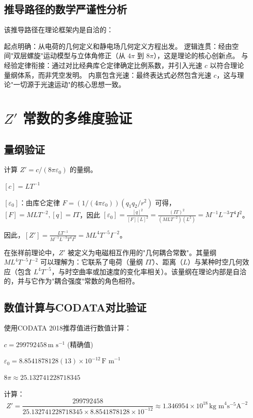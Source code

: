 \documentclass[a4paper,12pt]{article}
\theoremstyle{plain}
\begin{document}
\subsection{推导路径的数学严谨性分析}
该推导路径在理论框架内是自洽的：

起点明确：从电荷的几何定义和静电场几何定义方程出发。
逻辑连贯：经由空间"双层螺旋"运动模型与立体角修正（从 $4\pi$ 到 $8\pi$），这是理论的核心创新点。
与经验定律衔接：通过对比经典库仑定律确定比例系数，并引入光速 $c$ 以符合理论量纲体系，而非凭空发明。
内禀包含光速：最终表达式必然包含光速 $c$，这与理论"一切源于光速运动"的核心思想一致。

\section{$Z'$ 常数的多维度验证}

\subsection{量纲验证}
计算 $Z' = c/(8\pi\varepsilon_0)$ 的量纲。

$[c] = L T^{-1}$

$[\varepsilon_0]$：由库仑定律 $F = (1/(4\pi\varepsilon_0)) (q_1 q_2/r^2)$ 可得，$[F] = M L T^{-2}, [q] = I T$，因此 $[\varepsilon_0] = \frac{[q]^2}{[F][L]^2} = \frac{(I T)^2}{(M L T^{-2})(L^2)} = M^{-1} L^{-3} T^4 I^2$。

因此，$[Z'] = \frac{L T^{-1}}{M^{-1} L^{-3} T^4 I^2} = M L^4 T^{-5} I^{-2}$。

在张祥前理论中，$Z'$ 被定义为电磁相互作用的"几何耦合常数"。其量纲 $M L^4 T^{-5} I^{-2}$ 可以理解为：它联系了电荷（量纲 $I T$）、距离（$L$）与某种时空几何效应（包含 $L^4 T^{-5}$，与时空曲率或加速度的变化率相关）。该量纲在理论内部是自洽的，并与它作为"耦合强度"常数的角色相符。

\subsection{数值计算与CODATA对比验证}
使用CODATA 2018推荐值进行数值计算：

$c = 299792458 \, \text{m s}^{-1}$ (精确值)

$\varepsilon_0 = 8.8541878128(13) \times 10^{-12} \, \text{F m}^{-1}$

$8\pi \approx 25.132741228718345$

计算：
$$Z' = \frac{299792458}{25.132741228718345 \times 8.8541878128 \times 10^{-12}} \approx 1.346954 \times 10^{18} \, \text{kg m}^4 \text{s}^{-5} \text{A}^{-2}$$ 
\end{document}
